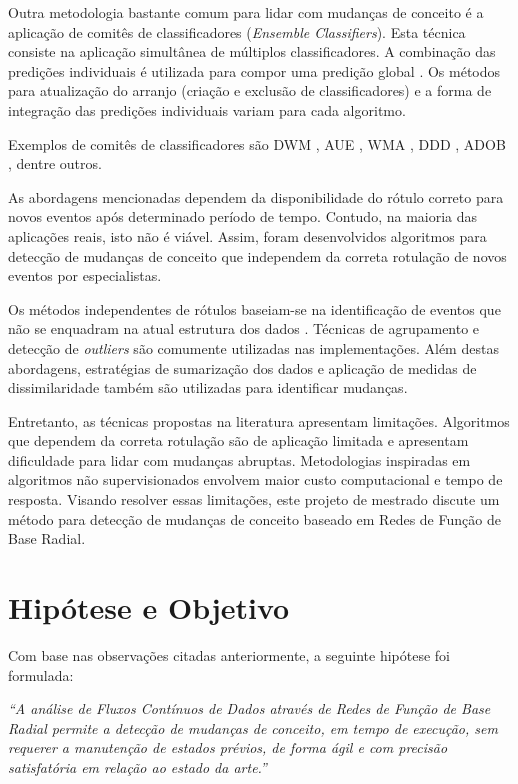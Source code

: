 \documentclass[qual, classic, a4paper]{ufbathesis}
\begin{document}
Outra metodologia bastante comum para lidar com mudanças de conceito é a aplicação de comitês de classificadores (\textit{Ensemble Classifiers}). 
Esta técnica consiste na aplicação simultânea de múltiplos classificadores.
A combinação das predições individuais é utilizada para compor uma predição global \cite{Gama:2014:SCD:2597757.2523813}.
Os métodos para atualização do arranjo (criação e exclusão de classificadores) e a forma de integração das predições individuais variam para cada algoritmo.

Exemplos de comitês de classificadores são 
DWM \cite{Kolter:2007:DWM:1314498.1390333}, AUE \cite{AUE}, 
WMA \cite{Blum1997}, DDD \cite{Minku:2012:DNE:2197077.2197204}, ADOB \cite{deCarvalhoSantos:2014:SUR:3120352.3120365}, dentre outros.

As abordagens mencionadas dependem da disponibilidade do rótulo correto para novos eventos após determinado período de tempo.
Contudo, na maioria das aplicações reais, isto não é viável. 
Assim, foram desenvolvidos algoritmos para detecção de mudanças de conceito que independem da correta rotulação de novos eventos por especialistas.

Os métodos independentes de rótulos baseiam-se na identificação de eventos que não se enquadram na atual estrutura dos dados \cite{Spinosa:2007:OCA:1244002.1244107}.
Técnicas de agrupamento e detecção de \textit{outliers} são comumente utilizadas nas implementações.
Além destas abordagens, estratégias de sumarização dos dados e aplicação de medidas de dissimilaridade \cite{Ryu:Kantardzic:2012} também são utilizadas para identificar mudanças.

Entretanto, as técnicas propostas na literatura apresentam limitações.
Algoritmos que dependem da correta rotulação são de aplicação limitada e apresentam dificuldade para lidar com mudanças abruptas.
Metodologias inspiradas em algoritmos não supervisionados envolvem maior custo computacional e tempo de resposta.
Visando resolver essas limitações, este projeto de mestrado discute um método para detecção de mudanças de conceito baseado em Redes de Função de Base Radial.

\section{Hipótese e Objetivo}

Com base nas observações citadas anteriormente, a seguinte hipótese foi formulada:

\begin{center}
\textit{``A análise de Fluxos Contínuos de Dados através de Redes de Função de Base Radial permite a detecção de mudanças de conceito, 
em tempo de execução, sem requerer a manutenção de estados prévios, de forma ágil e com precisão satisfatória em relação ao estado da arte.''}
\end{center}
\end{document}
